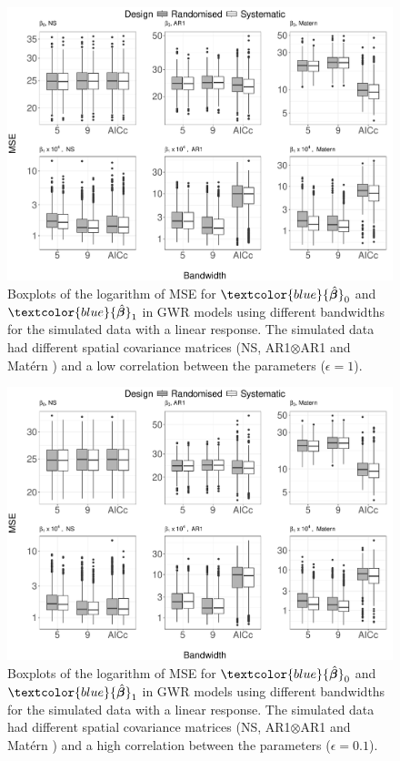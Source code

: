 \documentclass[a4paper]{article} 	%
\newcommand{\Matern}{Mat\'ern }
\newcommand{\zc}[1]{\textcolor{blue}{#1}}
\begin{document}
\begin{figure}[!htp]
	\centering
	\includegraphics[width=\linewidth]{Expt/Col_LinCombMSE_newpar_V3.pdf}
	\caption{Boxplots of the logarithm of MSE for $\zc{\hat{\bm{\beta}}}_0$ and $\zc{\hat{\bm{\beta}}}_1$ in GWR models using different bandwidths for the simulated data with a linear response. The simulated data had different spatial covariance matrices (NS, AR1$\otimes$AR1 and \Matern) and a low correlation between the parameters ($\epsilon=1$).}\label{fig:LinBetaMSE}
\end{figure}


\begin{figure}[!thp]
	\centering
	\includegraphics[width=\linewidth]{Expt/Col_LinCombMSE_newpar_eta01_V3.pdf}
	\caption{Boxplots of the logarithm of MSE for $\zc{\hat{\bm{\beta}}}_0$ and $\zc{\hat{\bm{\beta}}}_1$ in GWR models using different bandwidths for the simulated data with a linear response. The simulated data had different spatial covariance matrices (NS, AR1$\otimes$AR1 and \Matern) and a high correlation between the parameters ($\epsilon=0.1$).}\label{fig:LinBetaMSEeta01}
\end{figure}
\end{document}
